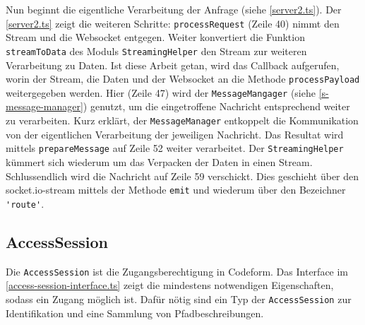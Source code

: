 
Nun beginnt die eigentliche Verarbeitung der Anfrage (siehe \autoref{server2.ts}). Der \autoref{server2.ts} zeigt die weiteren Schritte: \texttt{pro\-cess\-Re\-quest} (Zeile 40) nimmt den \gls{Stream} und die \gls{Websocket} entgegen. Weiter konvertiert die Funktion \texttt{stream\-To\-Da\-ta} des Moduls \verb|StreamingHelper| den \gls{Stream} zur weiteren Verarbeitung zu Daten. Ist diese Arbeit getan, wird das \gls{Callback} aufgerufen, worin der \gls{Stream}, die Daten und der \gls{Websocket} an die Methode \verb|processPayload| weitergegeben werden. Hier (Zeile 47) wird der \texttt{MessageMangager} (siehe \autoref{s-message-manager}) genutzt, um die eingetroffene Nachricht entsprechend weiter zu verarbeiten. Kurz erklärt, der \texttt{MessageManager} entkoppelt die Kommunikation von der eigentlichen Verarbeitung der jeweiligen Nachricht. Das Resultat wird mittels \texttt{prepareMessage} auf Zeile 52 weiter verarbeitet. Der \texttt{Stream\-ing\-Help\-er} kümmert sich wiederum um das Verpacken der Daten in einen \gls{Stream}. Schlussendlich wird die Nachricht auf Zeile 59 verschickt. Dies geschieht über den socket.io-stream mittels der Methode \texttt{emit} und wiederum über den Bezeichner \verb|'route'|.





\subsection{AccessSession}


Die \texttt{AccessSession} ist die Zugangsberechtigung in Codeform. Das Interface im \autoref{access-session-interface.ts} zeigt die mindestens notwendigen Eigenschaften, sodass ein Zugang möglich ist. Dafür nötig sind ein Typ der \texttt{AccessSession} zur Identifikation und eine Sammlung von Pfadbeschreibungen.

